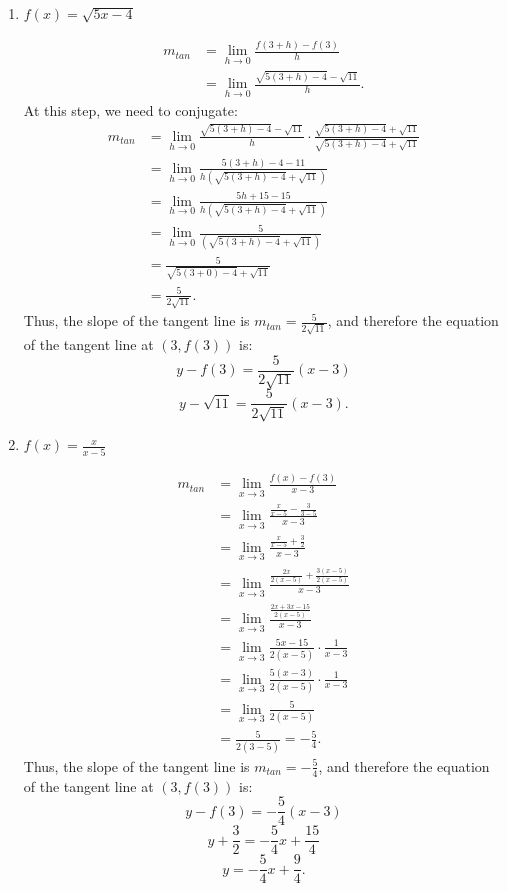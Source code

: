 \documentclass[nooutcomes]{ximera}
\begin{document}
\begin{problem}
\begin{enumerate}
	
	\item  $f(x) = \sqrt{5x-4}$
		\begin{freeResponse}
		\begin{align*}
		m_{tan} &= \lim_{h \to 0} \frac{f(3+h) - f(3)}{h}  \\
		&= \lim_{h \to 0} \frac{\sqrt{5(3+h) - 4} - \sqrt{11}}{h}.
		\end{align*}
		At this step, we need to conjugate:
		\begin{align*}
		m_{tan} &= \lim_{h \to 0} \frac{\sqrt{5(3+h) - 4} - \sqrt{11}}{h} \cdot \frac{\sqrt{5(3+h) - 4} + \sqrt{11}}{\sqrt{5(3+h) - 4} + \sqrt{11}} \\
		&= \lim_{h \to 0} \frac{5(3+h) - 4 - 11}{h \left( \sqrt{5(3+h) - 4} + \sqrt{11} \right) }  \\
		&= \lim_{h \to 0} \frac{5h + 15 - 15}{h \left( \sqrt{5(3+h) - 4} + \sqrt{11} \right) }  \\
		&= \lim_{h \to 0} \frac{5}{\left( \sqrt{5(3+h) - 4} + \sqrt{11} \right) }  \\
		&= \frac{5}{\sqrt{5(3+0) - 4} + \sqrt{11}}  \\
		&= \frac{5}{2 \sqrt{11}}.
		\end{align*}
		Thus, the slope of the tangent line is $m_{tan}=\frac{5}{2\sqrt{11}}$, and therefore the equation of the tangent line at $(3, f(3))$ is:
		$$y - f(3) = \frac{5}{2\sqrt{11}}(x-3)$$
		$$y - \sqrt{11} = \frac{5}{2\sqrt{11}}(x - 3).$$
		\end{freeResponse}
		
	
	\item  $f(x) = \frac{x}{x-5}$
		\begin{freeResponse}
		\begin{align*}
		m_{tan} &= \lim_{x \to 3} \frac{f(x) - f(3)}{x-3}  \\
		&= \lim_{x \to 3} \frac{\frac{x}{x-5} - \frac{3}{3-5}}{x-3}  \\
		&= \lim_{x \to 3} \frac{\frac{x}{x-5} + \frac{3}{2}}{x-3}  \\
		&= \lim_{x \to 3} \frac{\frac{2x}{2(x-5)} + \frac{3(x-5)}{2(x-5)}}{x-3}  \\
		&= \lim_{x \to 3} \frac{\frac{2x + 3x - 15}{2(x-5)}}{x-3}  \\
		&= \lim_{x \to 3} \frac{5x-15}{2(x-5)} \cdot \frac{1}{x-3}  \\
		&= \lim_{x \to 3} \frac{5(x-3)}{2(x-5)} \cdot \frac{1}{x-3}  \\
		&= \lim_{x \to 3} \frac{5}{2(x-5)}  \\
		&= \frac{5}{2(3-5)} = -\frac{5}{4}.
		\end{align*}
		Thus, the slope of the tangent line is $m_{tan}=- \frac{5}{4}$, and therefore the equation of the tangent line at $(3, f(3))$ is:
		$$y - f(3) = - \frac{5}{4}(x-3)$$
		$$y + \frac{3}{2} = - \frac{5}{4}x + \frac{15}{4}$$
		$$y = - \frac{5}{4} x + \frac{9}{4}.$$
		\end{freeResponse}
		
	
	\end{enumerate}
\end{problem}
\end{document}
